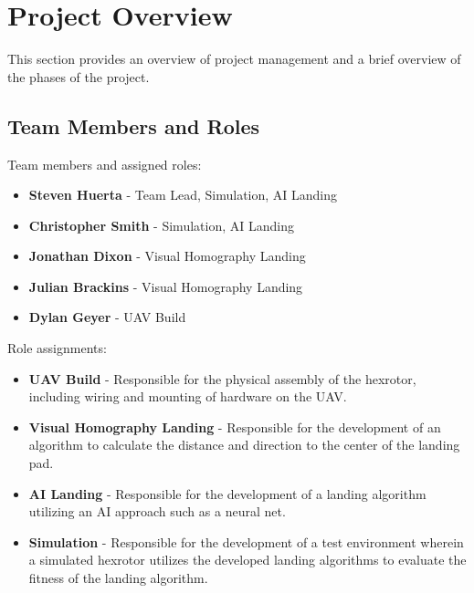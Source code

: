 

\chapter{Project Overview}
This section provides an overview of project management and a brief overview of the phases of the project.



\section{Team Members and Roles}
Team members and assigned roles:
\begin{itemize}
\item \textbf{Steven Huerta} - Team Lead, Simulation, AI Landing
\item \textbf{Christopher Smith} - Simulation, AI Landing
\item \textbf{Jonathan Dixon} - Visual Homography Landing
\item \textbf{Julian Brackins} - Visual Homography Landing
\item \textbf{Dylan Geyer} - UAV Build
\end{itemize}

\noindent Role assignments:
\begin{itemize}
\item \textbf{UAV Build} - Responsible for the physical assembly of the hexrotor, including wiring and mounting of hardware on the UAV.
\item \textbf{Visual Homography Landing} - Responsible for the development of an algorithm to calculate the distance and direction to the center of the landing pad. 
\item \textbf{AI Landing} - Responsible for the development of a landing algorithm utilizing an AI approach such as a neural net.
\item \textbf{Simulation} - Responsible for the development of a test environment wherein a simulated hexrotor utilizes the developed landing algorithms to evaluate the fitness of the landing algorithm.  
\end{itemize}




